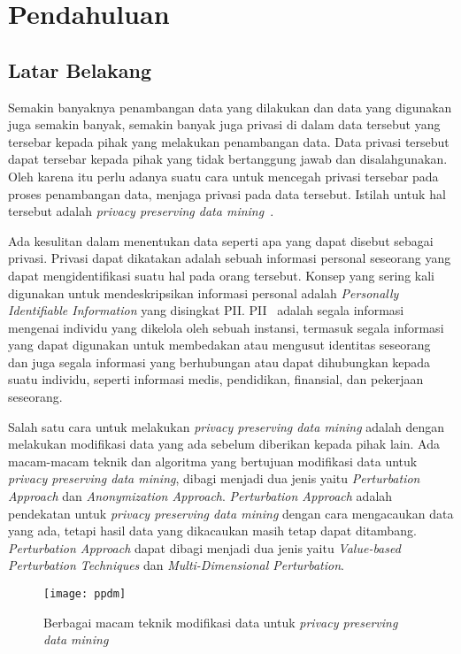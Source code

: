\chapter{Pendahuluan}
\label{chap:intro}
   
\section{Latar Belakang}
\label{sec:latar}
Semakin banyaknya penambangan data yang dilakukan dan data yang digunakan juga semakin banyak, semakin banyak juga privasi di dalam data tersebut yang tersebar kepada pihak yang melakukan penambangan data. Data privasi tersebut dapat tersebar kepada pihak yang tidak bertanggung jawab dan disalahgunakan. Oleh karena itu perlu adanya suatu cara untuk mencegah privasi tersebar pada proses penambangan data, menjaga privasi pada data tersebut. Istilah untuk hal tersebut adalah \textit{privacy preserving data mining}~\cite{rezaseifi:11:ppdm}.

Ada kesulitan dalam menentukan data seperti apa yang dapat disebut sebagai privasi. Privasi dapat dikatakan adalah sebuah informasi personal seseorang yang dapat mengidentifikasi suatu hal pada orang tersebut. Konsep yang sering kali digunakan untuk mendeskripsikan informasi personal adalah \textit{Personally Identifiable Information} yang disingkat PII. PII~\cite{nist:08:pii} adalah segala informasi mengenai individu yang dikelola oleh sebuah instansi, termasuk segala informasi yang dapat digunakan untuk membedakan atau mengusut identitas seseorang dan juga segala informasi yang berhubungan atau dapat dihubungkan kepada suatu individu, seperti informasi medis, pendidikan, finansial, dan pekerjaan seseorang. 

Salah satu cara untuk melakukan \textit{privacy preserving data mining} adalah dengan melakukan modifikasi data yang ada sebelum diberikan kepada pihak lain. Ada macam-macam teknik dan algoritma yang bertujuan modifikasi data untuk \textit{privacy preserving data mining}, dibagi menjadi dua jenis yaitu \textit{Perturbation Approach} dan \textit{Anonymization Approach}. \textit{Perturbation Approach} adalah pendekatan untuk \textit{privacy preserving data mining} dengan cara mengacaukan data yang ada, tetapi hasil data yang dikacaukan masih tetap dapat ditambang. \textit{Perturbation Approach} dapat dibagi menjadi dua jenis yaitu \textit{Value-based Perturbation Techniques} dan \textit{Multi-Dimensional Perturbation}.

\begin{figure}
	\centering
	\texttt{[image: ppdm]}
	\caption{Berbagai macam teknik modifikasi data untuk \textit{privacy preserving data mining}}
	\label{fig:ppdm}
\end{figure}


